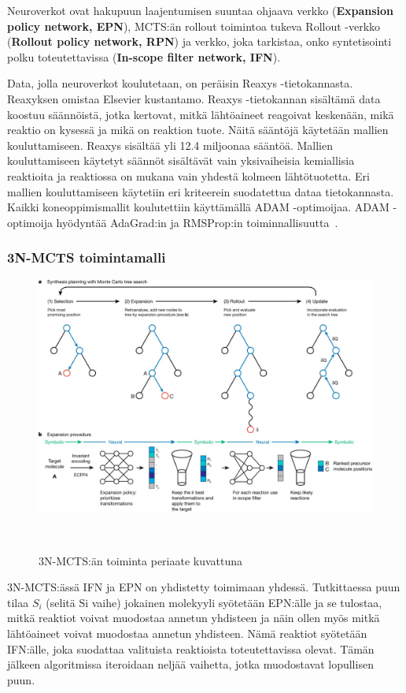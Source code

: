 \documentclass[finnish,twoside,censored,tkt,sw-line]{HYthesisML}
\begin{document}
Neuroverkot ovat hakupuun laajentumisen suuntaa ohjaava verkko (\textbf{Expansion policy network, EPN}), MCTS:än rollout toimintoa tukeva Rollout -verkko (\textbf{Rollout policy network, RPN}) ja verkko, joka tarkistaa, onko syntetisointi polku toteutettavissa (\textbf{In-scope filter network, IFN}).

Data, jolla neuroverkot koulutetaan, on peräisin Reaxys -tietokannasta.
Reaxyksen omistaa Elsevier kustantamo.
Reaxys -tietokannan sisältämä data koostuu säännöistä, jotka kertovat, mitkä lähtöaineet reagoivat keskenään, mikä reaktio on kysessä ja mikä on reaktion tuote.
Näitä sääntöjä käytetään mallien kouluttamiseen.
Reaxys sisältää yli 12.4 miljoonaa sääntöä.
Mallien kouluttamiseen käytetyt säännöt sisältävät vain yksivaiheisia kemiallisia reaktioita ja reaktiossa on mukana vain yhdestä kolmeen lähtötuotetta.
Eri mallien kouluttamiseen käytetiin eri kriteerein suodatettua dataa tietokannasta.
Kaikki koneoppimismallit koulutettiin käyttämällä ADAM -optimoijaa.
ADAM -optimoija hyödyntää AdaGrad:in ja RMSProp:in toiminnallisuutta~\cite{kingma2017adam}.

\subsubsection{3N-MCTS toimintamalli}

\begin{figure}
    \centering
    \includegraphics[width=\textwidth]{3N-MCTS-fig.jpg}
    \caption{3N-MCTS:än toiminta periaate kuvattuna}
    {~\cite{SeglerMarwinHS2018Pcsw}}
\end{figure}

3N-MCTS:ässä IFN ja EPN on yhdistetty toimimaan yhdessä.
Tutkittaessa puun tilaa \(S_i\) (selitä Si vaihe) jokainen molekyyli syötetään EPN:älle ja se tulostaa, mitkä reaktiot voivat muodostaa annetun yhdisteen ja näin ollen myös mitkä lähtöaineet voivat muodostaa annetun yhdisteen.
Nämä reaktiot syötetään IFN:älle, joka suodattaa valituista reaktioista toteutettavissa olevat.
Tämän jälkeen algoritmissa iteroidaan neljää vaihetta, jotka muodostavat lopullisen puun.
\end{document}

